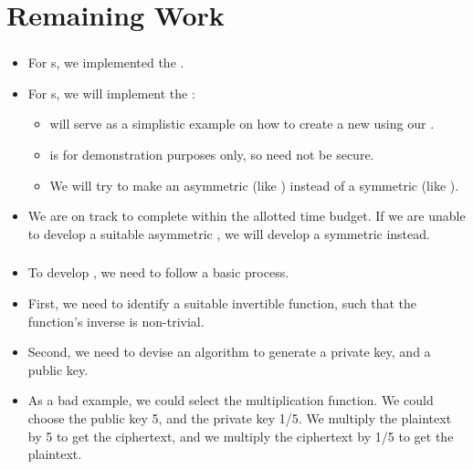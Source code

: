 \section{Remaining Work}


\begin{frame}
\frametitle{}
\begin{itemize}
\item For \eu s, we implemented the \rsa{} \cs.
\item For \cg s, we will implement the \dummy{} \cs:
  \begin{itemize}
  \item \dummy{} will serve as a simplistic example
    on how to create a new \cs{} using our \cry{} \cf.
  \item \dummy{} is for demonstration purposes only,
    so \dummy{} need not be secure.
  \item We will try to make \dummy{} an asymmetric \cs{}
    (like \rsa) instead of a symmetric \cs{} (like \aes).
  \end{itemize}
\item We are on track to complete \cry{} within the allotted
  time budget. If we are unable to develop a suitable
  asymmetric \cs{}, we will develop a symmetric \cs{}
  instead.
\end{itemize}
\end{frame}

\begin{frame}
\frametitle{}
\begin{itemize}
\item To develop \dummy{}, we need to follow a basic
  process.
\item First, we need to identify a suitable invertible
  function, such that the function's inverse is
  non-trivial.
\item Second, we need to devise an algorithm to generate
  a private key, and a public key.
\item As a bad example, we could select the multiplication
  function. We could choose the public key 5, and the
  private key 1/5. We multiply the plaintext by 5 to get
  the ciphertext, and we multiply the ciphertext by 1/5 to
  get the plaintext.
\end{itemize}
\end{frame}

